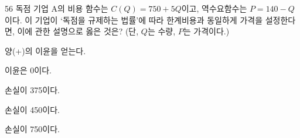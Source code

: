 \begin{question}{56}
독점 기업 A의 비용 함수는 $C(Q)=750+5Q$이고, 역수요함수는 $P=140-Q$이다. 이 기업이 ‘독점을 규제하는 법률’에 따라 한계비용과 동일하게 가격을 설정한다면, 이에 관한 설명으로 옳은 것은? (단, $Q$는 수량, $P$는 가격이다.)
\begin{choices}
  \item 양(+)의 이윤을 얻는다.
  \item 이윤은 0이다.
  \item 손실이 375이다.
  \item 손실이 450이다.
  \item 손실이 750이다.
\end{choices}
\end{question}
